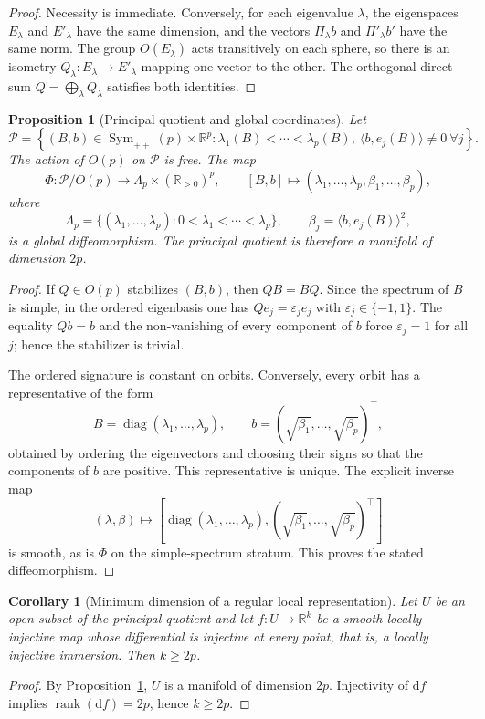 \documentclass[10pt,a4paper]{article}
\newtheorem{proposition}[theorem]{Proposition}
\newtheorem{corollary}[theorem]{Corollary}
\newcommand{\R}{\mathbb{R}}
\newcommand{\rank}{\operatorname{rank}}
\newcommand{\diag}{\operatorname{diag}}
\newcommand{\dd}{\mathrm d}
\begin{document}
\begin{proof}
Necessity is immediate. Conversely, for each eigenvalue $\lambda$, the eigenspaces $E_\lambda$ and $E'_\lambda$ have the same dimension, and the vectors $\Pi_\lambda b$ and $\Pi'_\lambda b'$ have the same norm. The group $O(E_\lambda)$ acts transitively on each sphere, so there is an isometry $Q_\lambda:E_\lambda\to E'_\lambda$ mapping one vector to the other. The orthogonal direct sum $Q=\bigoplus_\lambda Q_\lambda$ satisfies both identities.
\end{proof}

\begin{proposition}[Principal quotient and global coordinates]
Let
\[
\mathcal P=
\left\{(B,b)\in\operatorname{Sym}_{++}(p)\times\R^p:
\lambda_1(B)<\cdots<\lambda_p(B),\ 
\langle b,e_j(B)\rangle\neq0\ \forall j
\right\}.
\]
The action of $O(p)$ on $\mathcal P$ is free. The map
\[
\Phi:\mathcal P/O(p)\longrightarrow
\Lambda_p\times(\R_{>0})^p,
\qquad
[B,b]\longmapsto
(\lambda_1,\ldots,\lambda_p,\beta_1,\ldots,\beta_p),
\]
where
\[
\Lambda_p=\{(\lambda_1,\ldots,\lambda_p):0<\lambda_1<\cdots<\lambda_p\},
\qquad
\beta_j=\langle b,e_j(B)\rangle^2,
\]
is a global diffeomorphism. The principal quotient is therefore a manifold of dimension $2p$.
\label{prop:principal-quotient}
\end{proposition}
\begin{proof}
If $Q\in O(p)$ stabilizes $(B,b)$, then $QB=BQ$. Since the spectrum of $B$ is simple, in the ordered eigenbasis one has $Qe_j=\varepsilon_je_j$ with $\varepsilon_j\in\{-1,1\}$. The equality $Qb=b$ and the non-vanishing of every component of $b$ force $\varepsilon_j=1$ for all $j$; hence the stabilizer is trivial.

The ordered signature is constant on orbits. Conversely, every orbit has a representative of the form
\[
B=\diag(\lambda_1,\ldots,\lambda_p),
\qquad
b=(\sqrt{\beta_1},\ldots,\sqrt{\beta_p})^\top,
\]
obtained by ordering the eigenvectors and choosing their signs so that the components of $b$ are positive. This representative is unique. The explicit inverse map
\[
(\lambda,\beta)\longmapsto
\left[\diag(\lambda_1,\ldots,\lambda_p),
(\sqrt{\beta_1},\ldots,\sqrt{\beta_p})^\top\right]
\]
is smooth, as is $\Phi$ on the simple-spectrum stratum. This proves the stated diffeomorphism.
\end{proof}

\begin{corollary}[Minimum dimension of a regular local representation]
Let $U$ be an open subset of the principal quotient and let $f:U\to\R^k$ be a smooth locally injective map whose differential is injective at every point, that is, a locally injective immersion. Then $k\ge 2p$.
\end{corollary}
\begin{proof}
By Proposition~\ref{prop:principal-quotient}, $U$ is a manifold of dimension $2p$. Injectivity of $\dd f$ implies $\rank(\dd f)=2p$, hence $k\ge2p$.
\end{proof}
\end{document}
